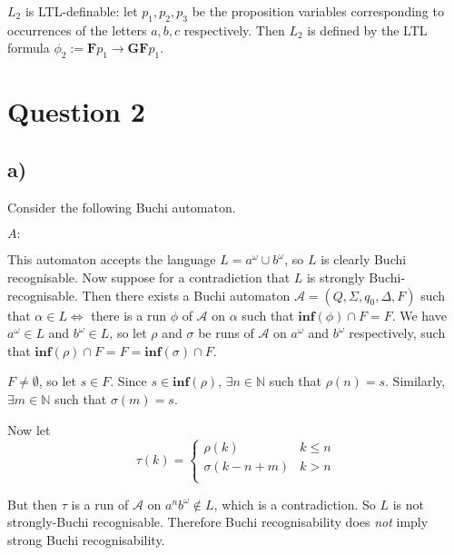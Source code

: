 \documentclass[11pt]{article}
\begin{document}

$L_2$ is LTL-definable: let $p_1, p_2, p_3$ be the proposition variables corresponding to occurrences of the letters $a, b, c$ respectively. Then $L_2$ is defined by the LTL formula $\phi_2 := \textbf{F}p_1 \rightarrow \textbf{GF}p_1$.

\section*{Question 2}

\subsection*{a)}

Consider the following Buchi automaton.

$A:$


This automaton accepts the language $L = a^\omega \cup b^\omega$, so $L$ is clearly Buchi recognisable. Now suppose for a contradiction that $L$ is strongly Buchi-recognisable. Then there exists a Buchi automaton $\mathcal{A} = (Q, \Sigma, q_0, \Delta, F)$ such that $\alpha \in L \iff $ there is a run $\phi$ of $\mathcal{A}$ on $\alpha$ such that $\textbf{inf}(\phi) \cap F = F$.
We have $a^\omega \in L $ and $b^\omega \in L$, so let $\rho$ and $\sigma$ be runs of $\mathcal{A}$ on $a^\omega$ and $b^\omega$ respectively, such that $\textbf{inf}(\rho) \cap F = F = \textbf{inf}(\sigma) \cap F$.

$F \neq \emptyset$, so let $s \in F$. Since $s \in \textbf{inf}(\rho)$, $\exists n \in \mathbb{N}$ such that $\rho(n) = s$. Similarly, $\exists m \in \mathbb{N}$ such that $\sigma(m) = s$.

Now let \begin{displaymath}
\tau(k) = \left\{
     \begin{array}{lr}
       \rho(k) &   k \leq n \\
       \sigma(k-n+m) & k > n \\
     \end{array}
   \right.
   \end{displaymath}

But then $\tau$ is a run of $\mathcal{A}$ on $a^n b^\omega \notin L$, which is a contradiction. So $L$ is not strongly-Buchi recognisable.
Therefore Buchi recognisability does \emph{not} imply strong Buchi recognisability.
\end{document}
